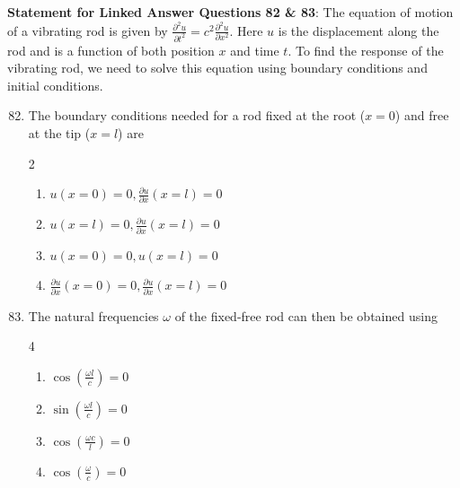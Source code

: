 \textbf{Statement for Linked Answer Questions 82 \& 83}: The equation of motion of a vibrating rod is given by $\frac{\partial^2 u}{\partial t^2} = c^2 \frac{\partial^2 u}{\partial x^2}$. Here $u$ is the displacement along the rod and is a function of both position $x$ and time $t$. To find the response of the vibrating rod, we need to solve this equation using boundary conditions and initial conditions.

\begin{enumerate}
    \setcounter{enumi}{81}
    \item The boundary conditions needed for a rod fixed at the root ($x=0$) and free at the tip ($x=l$) are
    \begin{multicols}{2}
    \begin{enumerate}
        \item $u(x=0) = 0, \frac{\partial u}{\partial x}(x=l) = 0$
        \item $u(x=l) = 0, \frac{\partial u}{\partial x}(x=l) = 0$
        \item $u(x=0) = 0, u(x=l) = 0$
        \item $\frac{\partial u}{\partial x}(x=0) = 0, \frac{\partial u}{\partial x}(x=l) = 0$
    \end{enumerate}
    \end{multicols}
    

    \item The natural frequencies $\omega$ of the fixed-free rod can then be obtained using
    \begin{multicols}{4}
    \begin{enumerate}
        \item $\cos \left( \frac{\omega l}{c} \right) = 0$
        \item $\sin \left( \frac{\omega l}{c} \right) = 0$
        \item $\cos \left( \frac{\omega c}{l} \right) = 0$
        \item $\cos \left( \frac{\omega}{c} \right) = 0$
    \end{enumerate}
    \end{multicols}
    
\end{enumerate}

\fi
